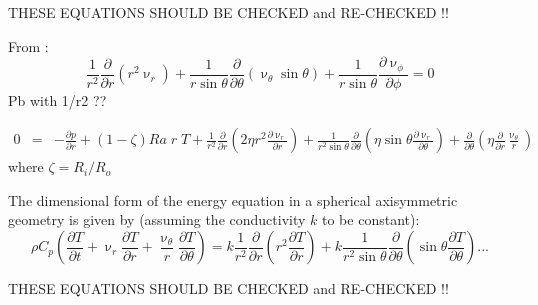 THESE EQUATIONS SHOULD BE CHECKED and RE-CHECKED !!



From \cite{zebi93}:
\begin{equation}
\frac{1}{r^2} \frac{\partial}{\partial r} (r^2 \upnu_r) + 
\frac{1}{r \sin \theta} \frac{\partial}{\partial \theta} (\upnu_\theta \sin \theta)+
\frac{1}{r \sin \theta} \frac{\partial \upnu_\phi}{\partial \phi} = 0
\end{equation}
Pb with 1/r2 ??

\begin{eqnarray}
0 &=& -\frac{\partial p}{\partial r} + (1-\zeta) Ra \; r \; T + 
\frac{1}{r^2}\frac{\partial}{\partial r} \left( 2 \eta r^2 \frac{\partial \upnu_r}{\partial r} \right)
+ \frac{1}{r^2 \sin\theta} \frac{\partial}{\partial\theta} 
\left( \eta \sin\theta \frac{\partial \upnu_r}{\partial\theta} \right)
+\frac{\partial}{\partial \theta} \left(\eta \frac{\partial}{\partial r} \frac{\upnu_\theta}{r} \right)
\end{eqnarray}
where $\zeta=R_i/R_o$


The dimensional form of the energy equation in a spherical axisymmetric geometry is given by
(assuming the conductivity $k$ to be constant):
\[
\rho C_p \left( \frac{\partial T}{\partial t}  + 
\upnu_r \frac{\partial T}{\partial r} + \frac{\upnu_\theta}{r} \frac{\partial T}{\partial \theta}
\right)
=
k \frac{1}{r^2} \frac{\partial}{\partial r} \left( r^2 \frac{\partial T}{\partial r} \right)
+
k \frac{1}{r^2 \sin\theta} 
\frac{\partial}{\partial \theta} \left( \sin\theta \frac{\partial T}{\partial \theta}  \right) 
...
\]

THESE EQUATIONS SHOULD BE CHECKED and RE-CHECKED !!




